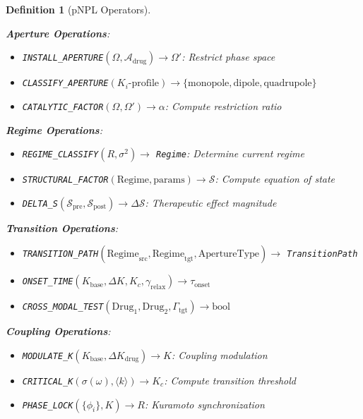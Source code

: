 \documentclass[twocolumn,10pt]{article}
\newtheorem{definition}[theorem]{Definition}
\theoremstyle{remark}
\newcommand{\Rorder}{R}
\newcommand{\Gstate}{\Gamma}
\begin{document}
\begin{definition}[pNPL Operators]
\label{def:pnpl_ops}

\textbf{Aperture Operations}:
\begin{itemize}[nosep]
  \item \texttt{INSTALL\_APERTURE}$(\Omega, \mathcal{A}_{\mathrm{drug}}) \to \Omega'$: Restrict phase space
  \item \texttt{CLASSIFY\_APERTURE}$(K_i\text{-profile}) \to \{\text{monopole}, \text{dipole}, \text{quadrupole}\}$
  \item \texttt{CATALYTIC\_FACTOR}$(\Omega, \Omega') \to \alpha$: Compute restriction ratio
\end{itemize}

\textbf{Regime Operations}:
\begin{itemize}[nosep]
  \item \texttt{REGIME\_CLASSIFY}$(\Rorder, \sigma^2) \to$ \texttt{Regime}: Determine current regime
  \item \texttt{STRUCTURAL\_FACTOR}$(\text{Regime}, \text{params}) \to \mathcal{S}$: Compute equation of state
  \item \texttt{DELTA\_S}$(\mathcal{S}_{\mathrm{pre}}, \mathcal{S}_{\mathrm{post}}) \to \Delta\mathcal{S}$: Therapeutic effect magnitude
\end{itemize}

\textbf{Transition Operations}:
\begin{itemize}[nosep]
  \item \texttt{TRANSITION\_PATH}$(\text{Regime}_{\mathrm{src}}, \text{Regime}_{\mathrm{tgt}}, \text{ApertureType}) \to$ \texttt{TransitionPath}
  \item \texttt{ONSET\_TIME}$(K_{\mathrm{base}}, \Delta K, K_c, \gamma_{\mathrm{relax}}) \to \tau_{\mathrm{onset}}$
  \item \texttt{CROSS\_MODAL\_TEST}$(\text{Drug}_1, \text{Drug}_2, \Gstate_{\mathrm{tgt}}) \to \text{bool}$
\end{itemize}

\textbf{Coupling Operations}:
\begin{itemize}[nosep]
  \item \texttt{MODULATE\_K}$(K_{\mathrm{base}}, \Delta K_{\mathrm{drug}}) \to K$: Coupling modulation
  \item \texttt{CRITICAL\_K}$(\sigma(\omega), \langle k \rangle) \to K_c$: Compute transition threshold
  \item \texttt{PHASE\_LOCK}$(\{\phi_i\}, K) \to \Rorder$: Kuramoto synchronization
\end{itemize}


\end{definition}
\end{document}
